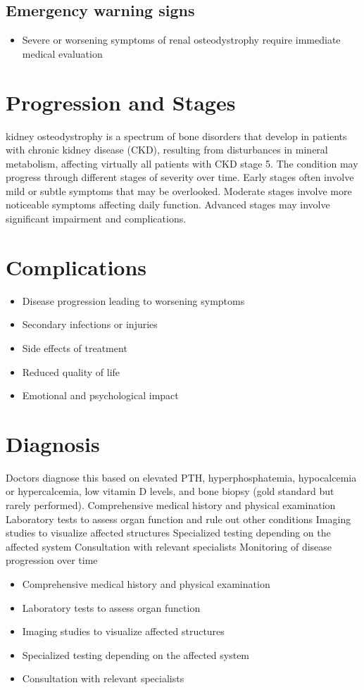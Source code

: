 \subsection{Emergency warning signs}
\begin{itemize}[noitemsep]
  \item Severe or worsening symptoms of renal osteodystrophy require immediate medical evaluation
\end{itemize}
\section{Progression and Stages}
kidney osteodystrophy is a spectrum of bone disorders that develop in patients with chronic kidney disease (CKD), resulting from disturbances in mineral metabolism, affecting virtually all patients with CKD stage 5. The condition may progress through different stages of severity over time. Early stages often involve mild or subtle symptoms that may be overlooked. Moderate stages involve more noticeable symptoms affecting daily function. Advanced stages may involve significant impairment and complications.
\section{Complications}
\begin{itemize}[noitemsep]
  \item Disease progression leading to worsening symptoms
  \item Secondary infections or injuries
  \item Side effects of treatment
  \item Reduced quality of life
  \item Emotional and psychological impact
\end{itemize}
\section{Diagnosis}
Doctors diagnose this based on elevated PTH, hyperphosphatemia, hypocalcemia or hypercalcemia, low vitamin D levels, and bone biopsy (gold standard but rarely performed). Comprehensive medical history and physical examination Laboratory tests to assess organ function and rule out other conditions Imaging studies to visualize affected structures Specialized testing depending on the affected system Consultation with relevant specialists Monitoring of disease progression over time

\begin{itemize}[noitemsep]
  \item Comprehensive medical history and physical examination
  \item Laboratory tests to assess organ function
  \item Imaging studies to visualize affected structures
  \item Specialized testing depending on the affected system
  \item Consultation with relevant specialists
\end{itemize}
